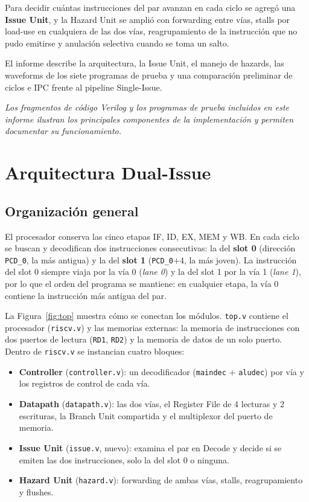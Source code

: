 \documentclass[12pt,a4paper]{article}
\begin{document}
Para decidir cuántas instrucciones del par avanzan en cada ciclo se agregó una \textbf{Issue Unit}, y la Hazard Unit se amplió con forwarding entre vías, stalls por load-use en cualquiera de las dos vías, reagrupamiento de la instrucción que no pudo emitirse y anulación selectiva cuando se toma un salto.

El informe describe la arquitectura, la Issue Unit, el manejo de hazards, las waveforms de los siete programas de prueba y una comparación preliminar de ciclos e IPC frente al pipeline Single-Issue.

\noindent\textit{Los fragmentos de código Verilog y los programas de prueba incluidos en este informe ilustran los principales componentes de la implementación y permiten documentar su funcionamiento.}

\section{Arquitectura Dual-Issue}
\label{sec:arq}

\subsection{Organización general}

El procesador conserva las cinco etapas IF, ID, EX, MEM y WB. En cada ciclo se buscan y decodifican dos instrucciones consecutivas: la del \textbf{slot 0} (dirección \texttt{PCD\_0}, la más antigua) y la del \textbf{slot 1} (\texttt{PCD\_0}$+4$, la más joven). La instrucción del slot 0 siempre viaja por la vía 0 (\textit{lane 0}) y la del slot 1 por la vía 1 (\textit{lane 1}), por lo que el orden del programa se mantiene: en cualquier etapa, la vía 0 contiene la instrucción más antigua del par.

La Figura~\ref{fig:top} muestra cómo se conectan los módulos. \texttt{top.v} contiene el procesador (\texttt{riscv.v}) y las memorias externas: la memoria de instrucciones con dos puertos de lectura (\texttt{RD1}, \texttt{RD2}) y la memoria de datos de un solo puerto. Dentro de \texttt{riscv.v} se instancian cuatro bloques:

\begin{itemize}
    \item \textbf{Controller} (\texttt{controller.v}): un decodificador (\texttt{maindec} + \texttt{aludec}) por vía y los registros de control de cada vía.
    \item \textbf{Datapath} (\texttt{datapath.v}): las dos vías, el Register File de 4 lecturas y 2 escrituras, la Branch Unit compartida y el multiplexor del puerto de memoria.
    \item \textbf{Issue Unit} (\texttt{issue.v}, nuevo): examina el par en Decode y decide si se emiten las dos instrucciones, solo la del slot 0 o ninguna.
    \item \textbf{Hazard Unit} (\texttt{hazard.v}): forwarding de ambas vías, stalls, reagrupamiento y flushes.
\end{itemize}
\end{document}
